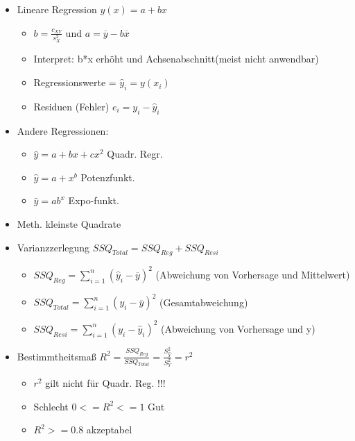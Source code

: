 \documentclass[a4paper]{article}
\begin{document}
\begin{landscape}
\begin{multicols}{4}
    \begin{itemize}[noitemsep,nolistsep,leftmargin=*]
        \item Lineare Regression $y(x) = a +bx$
        \begin{itemize}[noitemsep,nolistsep,leftmargin=*]
            \item $b = \frac{c_{XY}}{s_X^2}$ und $a = \overline{y} - b\overline{x}$
            \item Interpret: b*x erhöht und Achsenabschnitt(meist nicht anwendbar)
            \item Regressionswerte = $\widehat{y}_i = y(x_i)$
            \item Residuen (Fehler) $e_i = y_i - \widehat{y}_i$
        \end{itemize}
        \item Andere Regressionen:
        \begin{itemize}[noitemsep,nolistsep,leftmargin=*]
            \item $\hat{y} =  a+bx+cx^2$ Quadr. Regr.
            \item $\hat{y} =  a+x^b$ Potenzfunkt.
            \item $\hat{y} =  ab^x$ Expo-funkt.
        \end{itemize}
        \item Meth. kleinste Quadrate
        \item Varianzzerlegung $SSQ_{Total} = SSQ_{Reg} + SSQ_{Resi}$
        \begin{itemize}[noitemsep,nolistsep,leftmargin=*]
            \item $SSQ_{Reg} = \sum^n_{i=1} (\hat{y}_i-\overline{y})^2$ (Abweichung von Vorhersage und Mittelwert)
            \item $SSQ_{Total} = \sum^n_{i=1} (y_i-\overline{y})^2$ (Gesamtabweichung)
            \item $SSQ_{Resi} = \sum^n_{i=1} (y_i-\hat{y}_i)^2$ (Abweichung von Vorhersage und y)
        \end{itemize}
        \item Bestimmtheitsmaß $R^2 = \frac{SSQ_{Reg}}{SSQ_{Total}} = \frac{S^2_{\hat{Y}}}{S^2_Y} = r^2$
        \begin{itemize}[noitemsep,nolistsep,leftmargin=*]
            \item $r^2$ gilt nicht für Quadr. Reg. !!!
            \item Schlecht $0 <= R^2 <= 1$ Gut 
            \item $R^2 >= 0.8$ akzeptabel
        \end{itemize}

\end{itemize}
\end{multicols}
\end{landscape}
\end{document}
